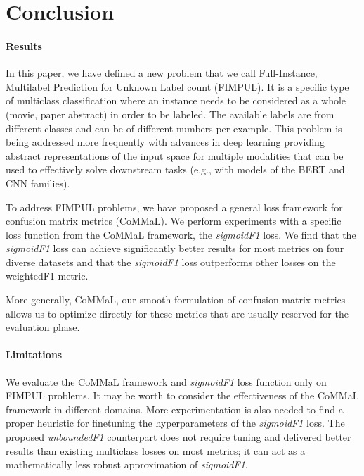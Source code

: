 
\section{Conclusion}
\label{sec:orged3d8a1}


\paragraph{Results}
In this paper, we have defined a new problem that we call Full-Instance, Multilabel Prediction for Unknown Label count (FIMPUL). It is a specific type of multiclass classification where an instance needs to be considered as a whole (movie, paper abstract) in order to be labeled. The available labels are from different classes and can be of different numbers per example. This problem is being addressed more frequently with advances in deep learning providing abstract representations of the input space for multiple modalities that can be used to effectively solve downstream tasks (e.g., with models of the BERT and CNN families).

To address FIMPUL problems, we have proposed a general loss framework for confusion matrix metrics (CoMMaL). We perform experiments with a specific loss function from the CoMMaL framework, the \emph{sigmoidF1} loss. We find that the \emph{sigmoidF1} loss can achieve significantly better results for most metrics on four diverse datasets and that the \emph{sigmoidF1} loss outperforms other losses on the weightedF1 metric.

More generally, CoMMaL, our smooth formulation of confusion matrix metrics allows us to optimize directly for these metrics that are usually reserved for the evaluation phase.

\paragraph{Limitations}
We evaluate the CoMMaL framework and \emph{sigmoidF1} loss function only on FIMPUL problems. It may be worth to consider the effectiveness of the CoMMaL framework in different domains. More experimentation is also needed to find a proper heuristic for finetuning the hyperparameters of the \emph{sigmoidF1} loss. The proposed \emph{unboundedF1} counterpart does not require tuning and delivered better results than existing multiclass losses on most metrics; it can act as a mathematically less robust approximation of \emph{sigmoidF1}.

